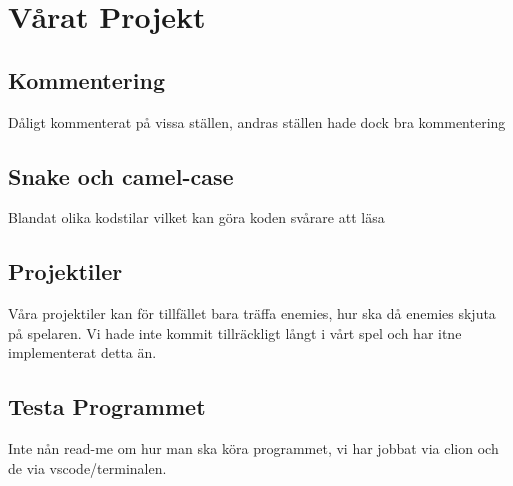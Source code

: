 \documentclass{TDP005mall}
\begin{document}
\section{Vårat Projekt}
\subsection{Kommentering}
Dåligt kommenterat på vissa ställen, andras ställen hade dock bra kommentering
\subsection{Snake och camel-case}
Blandat olika kodstilar vilket kan göra koden svårare att läsa

\subsection{Projektiler}
Våra projektiler kan för tillfället bara träffa enemies, hur ska då enemies skjuta på spelaren. Vi hade inte kommit tillräckligt långt i vårt spel och har itne implementerat detta än.

\subsection{Testa Programmet}
Inte nån read-me om hur man ska köra programmet, vi har jobbat via clion och de via vscode/terminalen.
\end{document}

